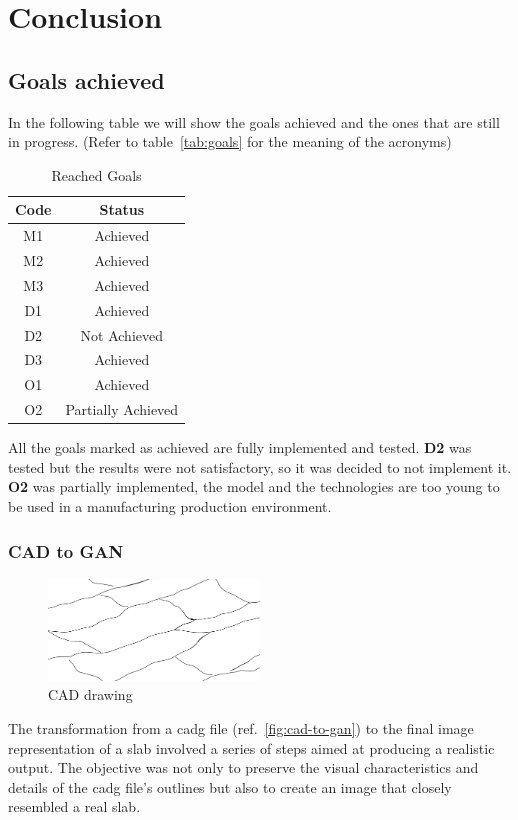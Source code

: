 \chapter{Conclusion}\label{cap:conclusions}
\section{Goals achieved}
In the following table we will show the goals achieved and the ones that are still in progress. (Refer to table~\ref{tab:goals} for the meaning of the acronyms)
\begin{table}[H]
    \caption{Reached Goals}\label{tab:reach-goals}
    \centering
    \begin{tabular}{|c|c|}
        \hline
        \textbf{Code} & \textbf{Status}\\
        \hline
        M1 & Achieved\\
        \hline
        M2 & Achieved\\
        \hline
        M3 & Achieved\\
        \hline
        D1 & Achieved\\
        \hline
        D2 & Not Achieved\\
        \hline
        D3 & Achieved\\
        \hline
        O1 & Achieved\\
        \hline
        O2 & Partially Achieved\\
        \hline
    \end{tabular}
\end{table}
All the goals marked as achieved are fully implemented and tested.
\textbf{D2} was tested but the results were not satisfactory, so it was decided to not implement it.
\textbf{O2} was partially implemented, the model and the technologies are too young to be used in a manufacturing production environment.
\subsection{CAD to GAN}\label{subsec:cad-to-gan}
\begin{figure}
    \centering
    \includegraphics[width=0.50\textwidth]{images/cad-to-gan/mask}
    \caption{CAD drawing}\label{fig:mask}
\end{figure}
The transformation from a \gls{cadg} file (ref.~\ref{fig:cad-to-gan}) to the final image representation of a slab involved a series of steps aimed at producing a realistic output. 
The objective was not only to preserve the visual characteristics and details of the \gls{cadg} file's outlines but also to create an image that closely resembled a real slab.

